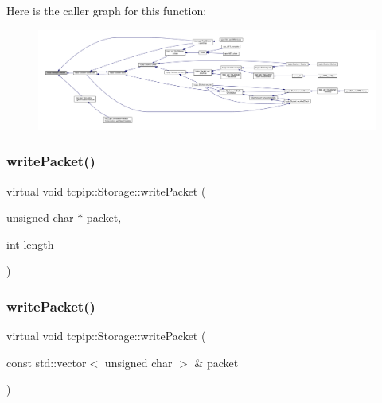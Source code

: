 Here is the caller graph for this function\+:
\nopagebreak
\begin{figure}[H]
\begin{center}
\leavevmode
\includegraphics[width=350pt]{classtcpip_1_1_storage_a1babffd3cee462277796bc5b4ef6bb1a_icgraph}
\end{center}
\end{figure}
\mbox{\label{classtcpip_1_1_storage_ae5c91a96be8c103708273d3f79855fa8}} 
\subsubsection{\texorpdfstring{write\+Packet()}{writePacket()}\hspace{0.1cm}{\footnotesize\ttfamily [1/2]}}
{\footnotesize\ttfamily virtual void tcpip\+::\+Storage\+::write\+Packet (\begin{DoxyParamCaption}\item[{unsigned char $\ast$}]{packet,  }\item[{int}]{length }\end{DoxyParamCaption})\hspace{0.3cm}{\ttfamily [virtual]}}

\mbox{\label{classtcpip_1_1_storage_abaf8bd3dd89102ea18f5cd85bc67b91c}} 
\subsubsection{\texorpdfstring{write\+Packet()}{writePacket()}\hspace{0.1cm}{\footnotesize\ttfamily [2/2]}}
{\footnotesize\ttfamily virtual void tcpip\+::\+Storage\+::write\+Packet (\begin{DoxyParamCaption}\item[{const std\+::vector$<$ unsigned char $>$ \&}]{packet }\end{DoxyParamCaption})\hspace{0.3cm}{\ttfamily [virtual]}}

